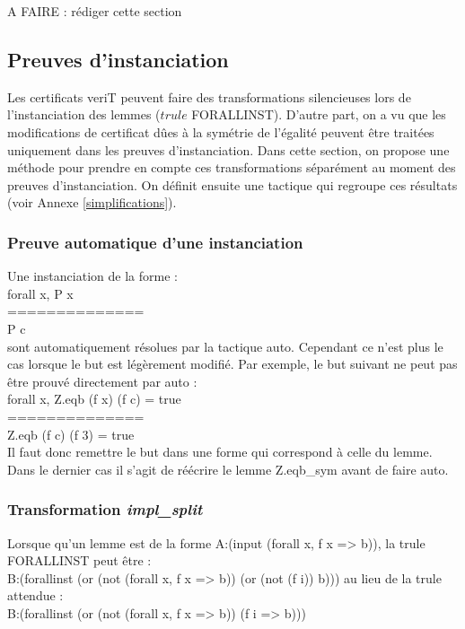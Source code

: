 \documentclass[11pt]{article}
\begin{document}
A FAIRE : rédiger cette section



\subsection{Preuves d'instanciation}

Les certificats veriT peuvent faire des transformations silencieuses lors de l'instanciation des lemmes ($trule$ FORALLINST). D'autre part, on a vu que les modifications de certificat dûes à la symétrie de l'égalité peuvent être traitées uniquement dans les preuves d'instanciation. Dans cette section, on propose une méthode pour prendre en compte ces transformations séparément au moment des preuves d'instanciation. On définit ensuite une tactique qui regroupe ces résultats (voir Annexe \ref{simplifications}).

\subsubsection{Preuve automatique d'une instanciation}

Une instanciation de la forme :\\
forall x, P x \\
==============\\
P c \\
sont automatiquement résolues par la tactique auto. Cependant ce n'est plus le cas lorsque le but est légèrement modifié. Par exemple, le but suivant ne peut pas être prouvé directement par auto : \\
forall x, Z.eqb (f x) (f c) = true \\
==============\\
Z.eqb (f c) (f 3) = true \\

Il faut donc remettre le but dans une forme qui correspond à celle du lemme. Dans le dernier cas il s'agit de réécrire le lemme Z.eqb\_sym avant de faire auto.

\subsubsection{Transformation \textit{impl\_split}}

Lorsque qu'un lemme est de la forme A:(input (forall x, f x => b)), la trule FORALLINST peut être :\\
B:(forallinst (or (not (forall x, f x => b)) (or (not (f i)) b)))
au lieu de la trule attendue : \\
B:(forallinst (or (not (forall x, f x => b)) (f i => b)))
\end{document}

